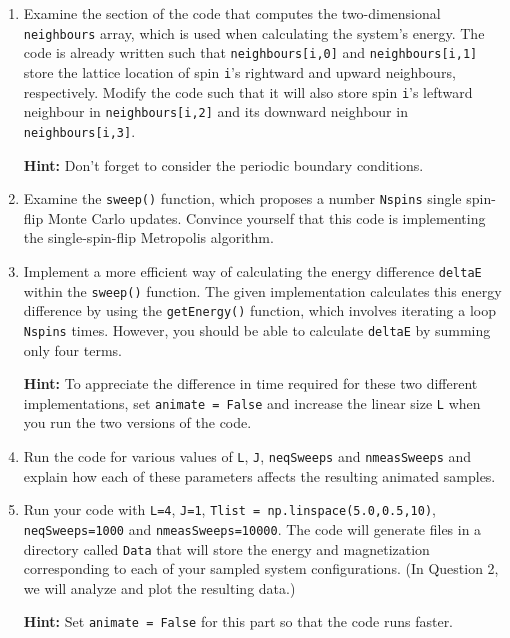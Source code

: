 \documentclass[letterpaper]{scrartcl}
\begin{document}
\begin{enumerate}[label=\alph*)]

\item Examine the section of the code that computes the two-dimensional \texttt{neighbours} array, which is used when calculating the system's energy. 
The code is already written such that \texttt{neighbours[i,0]} and \texttt{neighbours[i,1]} 
store the lattice location of spin \texttt{i}'s rightward and upward neighbours, respectively.
Modify the code such that it will also store spin \texttt{i}'s leftward neighbour in \texttt{neighbours[i,2]} and its downward neighbour in \texttt{neighbours[i,3]}.

\textbf{Hint:} Don't forget to consider the periodic boundary conditions.

\item Examine the \texttt{sweep()} function, which proposes a number \texttt{N{\textunderscore}spins} single spin-flip Monte Carlo updates.
Convince yourself that this code is implementing the single-spin-flip Metropolis algorithm.

\item Implement a more efficient way of calculating the energy difference \texttt{deltaE} within the \texttt{sweep()} function. 
The given implementation calculates this energy difference by using the \texttt{getEnergy()} function, 
which involves iterating a loop \texttt{N{\textunderscore}spins} times.
However, you should be able to calculate \texttt{deltaE} by summing only four terms.

\textbf{Hint:} To appreciate the difference in time required for these two different implementations, 
set \texttt{animate = False} and increase the linear size \texttt{L} when you run the two versions of the code.

\item Run the code for various values of \texttt{L}, \texttt{J}, \texttt{n{\textunderscore}eqSweeps} and \texttt{n{\textunderscore}measSweeps} 
and explain how each of these parameters affects the resulting animated samples.

\item Run your code with \texttt{L=4}, \texttt{J=1}, 
\texttt{T{\textunderscore}list = np.linspace(5.0,0.5,10)}, \texttt{n{\textunderscore}eqSweeps=1000} and \texttt{n{\textunderscore}measSweeps=10000}.
The code will generate files in a directory called \texttt{Data} that will store the energy and magnetization 
corresponding to each of your sampled system configurations.
(In Question 2, we will analyze and plot the resulting data.)

\textbf{Hint:} Set \texttt{animate = False} for this part so that the code runs faster.

\end{enumerate}
\end{document}
